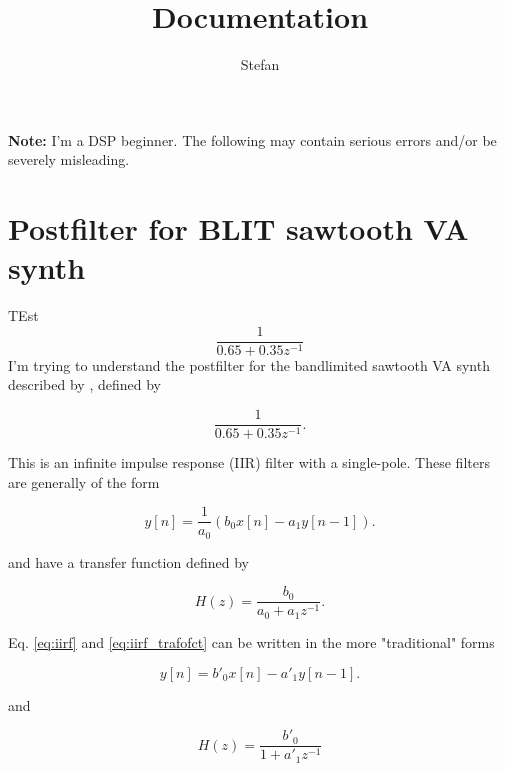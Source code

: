 \documentclass[12pt,a4paper]{article}
\title{Documentation}
\author{Stefan}
\begin{document}
\setlength{\parindent}{0cm}
\maketitle


{\bf Note:} I'm a DSP beginner. The following may contain serious errors and/or be severely misleading.

\section{Postfilter for BLIT sawtooth VA synth}\label{sec:dsp}

TEst \[\frac{1}{0.65+0.35z^{-1}}\]
 I'm trying to understand the postfilter for the bandlimited sawtooth VA synth described by 
\cite[][his page 17]{frei2002digital}, defined by

\begin{equation}\label{eq:freifilter}
    \frac{1}{0.65+0.35z^{-1}}.
\end{equation}

This is an infinite impulse response (IIR) filter with a single-pole. These filters are generally of the form \citep{wiki:IIR}

\begin{equation}\label{eq:iirf}
y[n]=\frac{1}{a_0} (b_0x[n]-a_1y[n-1]).
\end{equation}

and have a transfer function defined by

\begin{equation}\label{eq:iirf_trafofct}
H(z)=\frac{b_0}{a_0+a_1z^{-1}}.
\end{equation}

Eq. \ref{eq:iirf} and \eqref{eq:iirf_trafofct} can be written in the more "traditional" \citep{wiki:IIR} forms

\begin{equation}\label{eq:iirf_normal}
y[n]=b'_0x[n]-a'_1y[n-1].
\end{equation}

and

\begin{equation}\label{eq:iirf_trafofct_normal}
H(z)=\frac{b'_0}{1+a'_1z^{-1}}
\end{equation}
\end{document}
